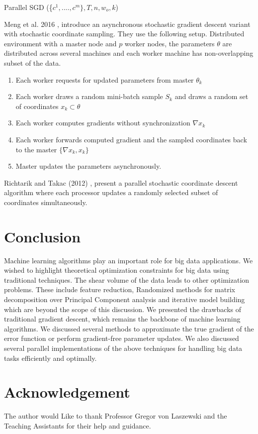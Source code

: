 \documentclass[sigconf]{acmart}
\begin{document}
\begin{algorithm}

\caption{Parallel SGD (\{$ c^1,....,c^m\} , T, n, w_o,k$)}\label{SGD}

\begin{algorithmic}[1] 
\EndFor
\EndWhile
\end{algorithmic}

\end{algorithm}

Meng et al. 2016 \cite{Meng}, introduce an asynchronous stochastic gradient descent variant with stochastic coordinate sampling. They use the following setup. Distributed environment with a master node and $p$ worker nodes, the parameters $\theta$ are distributed across several machines and each worker machine has non-overlapping subset of the data.

\begin{enumerate}
\item Each worker requests for updated parameters from master $\theta_k$
\item Each worker draws a random mini-batch sample $S_k$ and draws a random set of coordinates $x_k \subset \theta$
\item Each worker computes gradients without synchronization $\nabla x_k$
\item Each worker forwards computed gradient and the sampled coordinates back to the master $\{\nabla x_k , x_k \}$
\item Master updates the parameters asynchronously.
\end{enumerate}


Richtarik and Takac (2012) \cite{2012arXiv}, present a parallel stochastic coordinate descent algorithm where each processor updates a randomly selected subset of coordinates simultaneously. 

\section{Conclusion} \label{conclude}

Machine learning algorithms play an important role for big data applications. We wished to highlight theoretical optimization constraints for big data using traditional techniques. The shear volume of the data leads to other optimization problems. These include feature reduction, Randomized methods for matrix decomposition over Principal Component analysis and iterative model building which are beyond the scope of this discussion. We presented the drawbacks of traditional gradient descent, which remains the backbone of machine learning algorithms. We discussed several methods to approximate the true gradient of the error function or perform gradient-free parameter updates. We also discussed several parallel implementations of the above techniques for handling big data tasks efficiently and optimally. 

\section {Acknowledgement}

The author would Like to thank Professor Gregor von Laszewski and the Teaching Assistants for their help and guidance.


 
\end{document}
